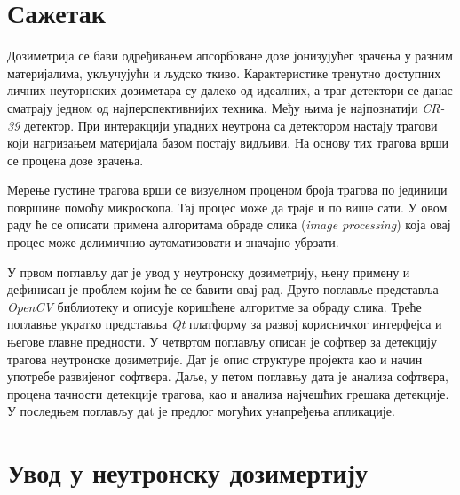 \documentclass[11pt,a4paper,serbian,oneside]{book}
\begin{document}


%
%
%

\tableofcontents
\newpage

%
%
%

\chapter*{Сажетак}

Дозиметрија се бави одређивањем апсорбоване дозе јонизујућег зрачења у разним материјалима, укључујући и људско ткиво. Карактеристике тренутно доступних личних неуторнских дозиметара су далеко од идеалних, а траг детектори се данас сматрају једном од најперспективнијих техника. Међу њима је најпознатији \textit{CR-39} детектор. При интеракцији упадних неутрона са детектором настају трагови који нагризањем материјала базом постају видљиви. На основу тих трагова врши се процена дозе зрачења. 

Мерење густине трагова врши се визуелном проценом броја трагова по јединици површине помоћу микроскопа. Тај процес може да траје и по више сати. У овом раду ће се описати примена алгоритама обраде слика (\textit{image processing}) која овај процес може делимичнио аутоматизовати и значајно убрзати.

У првом поглављу дат је увод у неутронску дозиметрију, њену примену и дефинисан је проблем којим ће се бавити овај рад. Друго поглавље представља \textit{OpenCV} библиотеку и описује коришћене алгоритме за обраду слика. Треће поглавње укратко представља \textit{Qt} платформу за развој корисничког интерфејса и његове главне предности. У четвртом поглављу описан је софтвер за детекцију трагова неутронске дозиметрије. Дат је опис структуре пројекта као и начин употребе развијеног софтвера. Даље, у петом поглавњу дата је анализа софтвера, процена тачности детекције трагова, као и анализа најчешћих грешака детекције. У последњем поглављу даt је предлог могућих унапређења апликације.

%
%
%

\chapter{Увод у неутронску дозимертију}
\end{document}
